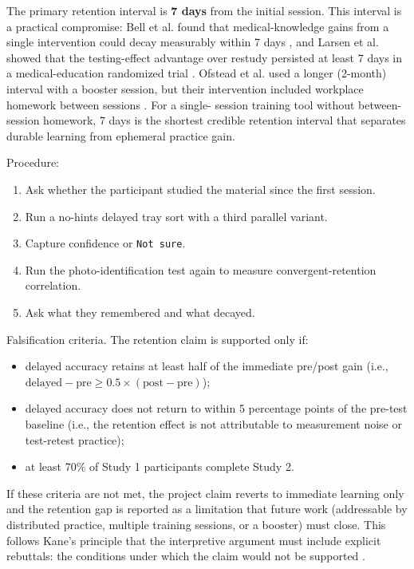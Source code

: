 \documentclass[10pt,a4paper]{article}
\begin{document}
The primary retention interval is \textbf{7 days} from the initial session. This
interval is a practical compromise: Bell et al. found that medical-knowledge
gains from a single intervention could decay measurably within 7 days
\cite{bell-et-al-2008}, and Larsen et al. showed that the testing-effect
advantage over restudy persisted at least 7 days in a medical-education
randomized trial \cite{larsen-et-al-2009}. Ofstead et al. used a longer
(2-month) interval with a booster session, but their intervention included
workplace homework between sessions \cite{ofstead-et-al-2023}. For a single-
session training tool without between-session homework, 7 days is the shortest
credible retention interval that separates durable learning from ephemeral
practice gain.

Procedure:
\begin{enumerate}
  \item Ask whether the participant studied the material since the first session.
  \item Run a no-hints delayed tray sort with a third parallel variant.
  \item Capture confidence or \texttt{Not sure}.
  \item Run the photo-identification test again to measure convergent-retention correlation.
  \item Ask what they remembered and what decayed.
\end{enumerate}

Falsification criteria. The retention claim is supported only if:
\begin{itemize}
  \item delayed accuracy retains at least half of the immediate pre/post gain
  (i.e., $\text{delayed} - \text{pre} \ge 0.5 \times (\text{post} - \text{pre})$);
  \item delayed accuracy does not return to within 5 percentage points of the
  pre-test baseline (i.e., the retention effect is not attributable to measurement
  noise or test-retest practice);
  \item at least 70\% of Study 1 participants complete Study 2.
\end{itemize}
If these criteria are not met, the project claim reverts to immediate learning
only and the retention gap is reported as a limitation that future work
(addressable by distributed practice, multiple training sessions, or a booster)
must close. This follows Kane's principle that the interpretive argument must
include explicit rebuttals: the conditions under which the claim would not be
supported \cite{kane-validity-2013}.
\end{document}

